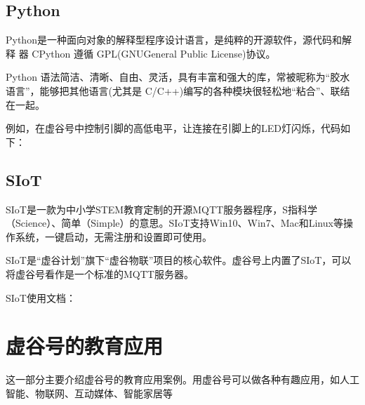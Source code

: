 \documentclass[letterpaper,10pt,english]{sphinxmanual}
\begin{document}
\section{Python}
\label{\detokenize{05.soft/5.5-Python:python}}\label{\detokenize{05.soft/5.5-Python::doc}}
Python是一种面向对象的解释型程序设计语言，是纯粹的开源软件，源代码和解释 器 CPython 遵循 GPL(GNUGeneral Public License)协议。

Python 语法简洁、清晰、自由、灵活，具有丰富和强大的库，常被昵称为“胶水语言”，能够把其他语言(尤其是 C/C++)编写的各种模块很轻松地“粘合”、联结在一起。

例如，在虚谷号中控制引脚的高低电平，让连接在引脚上的LED灯闪烁，代码如下：
\begin{quote}

\begin{sphinxVerbatim}[commandchars=\\\{\}]
   
 
    
 
\end{sphinxVerbatim}
\end{quote}


\section{SIoT}
\label{\detokenize{05.soft/5.6-SIoT:siot}}\label{\detokenize{05.soft/5.6-SIoT::doc}}
SIoT是一款为中小学STEM教育定制的开源MQTT服务器程序，S指科学（Science）、简单（Simple）的意思。SIoT支持Win10、Win7、Mac和Linux等操作系统，一键启动，无需注册和设置即可使用。

SIoT是“虚谷计划”旗下“虚谷物联”项目的核心软件。虚谷号上内置了SIoT，可以将虚谷号看作是一个标准的MQTT服务器。

SIoT使用文档：


\chapter{虚谷号的教育应用}
\label{\detokenize{06.edu/index:id1}}\label{\detokenize{06.edu/index::doc}}
这一部分主要介绍虚谷号的教育应用案例。用虚谷号可以做各种有趣应用，如人工智能、物联网、互动媒体、智能家居等
\end{document}
